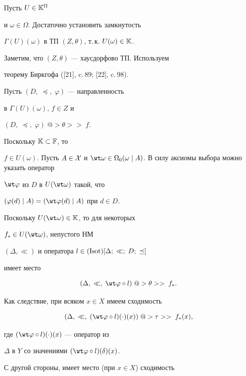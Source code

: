 \begin{pf}


Пусть $U \in {{\Bbb K}^{\Omega}}$


и $\omega \in \Omega$. Достаточно установить замкнутость


${\Gamma}(U)(\omega)$ в ТП $(Z,\theta)$, т.\,к. ${U(\omega)} \in {\Bbb K}$.


Заметим, что $(Z,\theta)$ --- хаусдорфово ТП. Используем


теорему Биркгофа ([21], c.\,89; [22], c.\,98).


Пусть $(D,\;\preceq,\;\varphi)$ --- направленность


в ${\Gamma}(U)(\omega)$, $f \in Z$ и


$(D,\;\preceq,\;\varphi)\;@>{\theta}>>\;f$.


Поскольку ${\Bbb K} \subset {\Bbb F}$, то


$f \in {U(\omega)}$. Пусть $A \in {\cal X}$ и ${\wt \omega} \in


{{\Omega}_0}(\omega \mid A)$. В силу аксиомы выбора можно указать оператор


$\wt \varphi$ из $D$ в $U(\wt \omega)$ такой, что


$({\varphi}(d) \mid A) = ({\wt \varphi}(d) \mid A)$ при $d \in D$.


Поскольку $U(\wt \omega) \in {\Bbb K}$, то для некоторых


${f_*} \in {U(\wt \omega)}$, непустого НМ


$(\Delta,\ll)$ и оператора $l \in (\operatorname{Isot})[\Delta;\;\ll;\;D;\;\preceq]$


имеет место


$$


(\Delta,\;\ll,\;{\wt \varphi} \circ l)\;@>{\theta}>>\;{f_*}.


$$


Как следствие, при всяком $x \in X$ имеем сходимость


\begin{equation}


(\Delta,\;\ll,\;


({\wt \varphi} \circ l)(\cdot)(x))\;@>{\tau}>>\;{f_*}(x),


\end{equation}


где $({\wt \varphi} \circ l)(\cdot)(x)$ --- оператор из


$\Delta$ в $Y$ со значениями $({\wt \varphi} \circ l)(\delta)(x)$.


С другой стороны, имеет место (при $x \in X$) сходимость



\end{pf}
